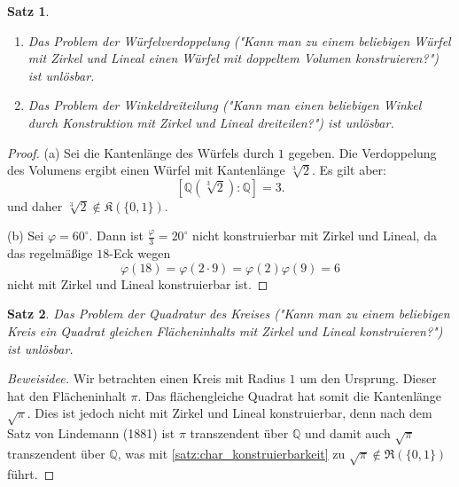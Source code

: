 \documentclass[a4paper, twoside, 11pt, ngerman]{report}
\newcommand{\QQ}{\mathds Q}
\newcommand{\frakK}{\mathfrak K}
\theoremstyle{definistyle}
\newtheorem{satz}{Satz}[section]
\theoremstyle{remark}
\begin{document}
\begin{satz}
\begin{enumerate}[label=(\alph*)]
\item Das Problem der Würfelverdoppelung ("Kann man zu einem beliebigen Würfel mit Zirkel und Lineal einen Würfel mit doppeltem Volumen konstruieren?") ist unlösbar.
\item Das Problem der Winkeldreiteilung ("Kann man einen beliebigen Winkel durch Konstruktion mit Zirkel und Lineal dreiteilen?") ist unlösbar.
\end{enumerate}
\end{satz}

\begin{proof}
(a) Sei die Kantenlänge des Würfels durch $1$ gegeben. Die Verdoppelung des Volumens ergibt einen Würfel mit Kantenlänge $\sqrt[3]{2}$. 
Es gilt aber: 
\[
[\QQ(\sqrt[3]{2}) : \QQ] = 3 .
\]
und daher $\sqrt[3]{2} \notin \frakK(\{0,1\})$.

(b) Sei $\varphi = 60^\circ$. Dann ist $\frac{\varphi}{3} = 20^\circ$ nicht konstruierbar mit Zirkel und Lineal, da das regelmäßige $18$-Eck wegen 
\[
\varphi(18) = \varphi(2 \cdot 9) = \varphi(2) \varphi(9) = 6
\]
nicht mit Zirkel und Lineal konstruierbar ist.
\end{proof}

\begin{satz}
Das Problem der Quadratur des Kreises ("Kann man zu einem beliebigen Kreis ein Quadrat gleichen Flächeninhalts mit Zirkel und Lineal konstruieren?") ist unlösbar.
\end{satz}

\begin{proof}[Beweisidee]
Wir betrachten einen Kreis mit Radius $1$ um den Ursprung. Dieser hat den Flächeninhalt $\pi$. Das flächengleiche Quadrat hat somit die Kantenlänge $\sqrt{\pi}$. Dies ist jedoch nicht mit Zirkel und Lineal konstruierbar, denn nach dem Satz von Lindemann (1881) ist $\pi$ transzendent über $\QQ$ und damit auch $\sqrt{\pi}$ transzendent über $\QQ$, was mit \ref{satz:char_konstruierbarkeit} zu $\sqrt{\pi} \notin \mathfrak{R}(\{0,1\})$ führt.
\end{proof}
\end{document}
